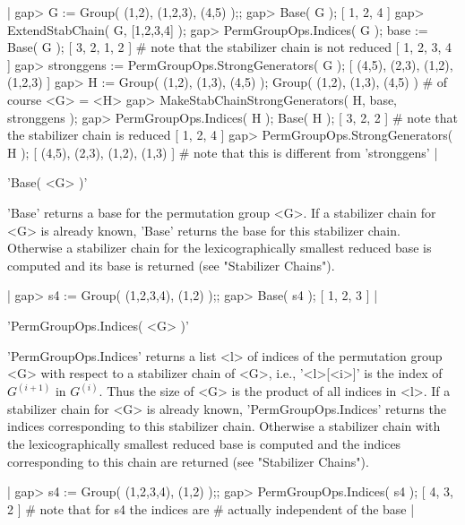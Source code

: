 |    gap> G := Group( (1,2), (1,2,3), (4,5) );;
    gap> Base( G );
    [ 1, 2, 4 ]
    gap> ExtendStabChain( G, [1,2,3,4] );
    gap> PermGroupOps.Indices( G );  base := Base( G );
    [ 3, 2, 1, 2 ]    # note that the stabilizer chain is not reduced
    [ 1, 2, 3, 4 ]
    gap> stronggens := PermGroupOps.StrongGenerators( G );
    [ (4,5), (2,3), (1,2), (1,2,3) ]
    gap> H := Group( (1,2), (1,3), (4,5) );
    Group( (1,2), (1,3), (4,5) )    # of course <G> = <H>
    gap> MakeStabChainStrongGenerators( H, base, stronggens );
    gap> PermGroupOps.Indices( H );  Base( H );
    [ 3, 2, 2 ]       # note that the stabilizer chain is reduced
    [ 1, 2, 4 ]
    gap> PermGroupOps.StrongGenerators( H );
    [ (4,5), (2,3), (1,2), (1,3) ]
    # note that this is different from 'stronggens' |


'Base( <G> )'

'Base'  returns a base  for the permutation group <G>.   If a  stabilizer
chain  for  <G>  is  already known,  'Base'  returns  the  base  for this
stabilizer chain.  Otherwise a stabilizer chain for the lexicographically
smallest  reduced  base  is  computed  and  its  base  is  returned  (see
"Stabilizer Chains").

|    gap> s4 := Group( (1,2,3,4), (1,2) );;
    gap> Base( s4 );
    [ 1, 2, 3 ]  |


'PermGroupOps.Indices( <G> )'

'PermGroupOps.Indices'  returns a list <l>  of indices of the permutation
group <G> with  respect to a stabilizer chain of <G>, i.e., '<l>[<i>]' is
the index of  $G^{(i+1)}$  in $G^{(i)}$.  Thus  the size  of  <G>  is the
product of all indices in <l>.  If  a stabilizer chain for <G> is already
known,  'PermGroupOps.Indices' returns the indices  corresponding to this
stabilizer    chain.    Otherwise    a   stabilizer   chain    with   the
lexicographically  smallest reduced  base  is  computed  and  the indices
corresponding to this chain are returned (see "Stabilizer Chains").

|    gap> s4 := Group( (1,2,3,4), (1,2) );;
    gap> PermGroupOps.Indices( s4 );
    [ 4, 3, 2 ]    # note that for s4 the indices are
                   # actually independent of the base |

